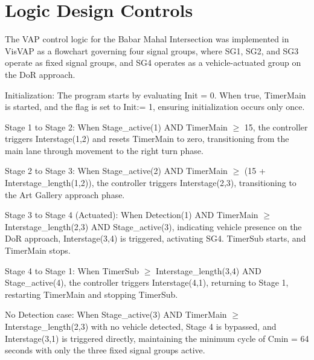 \newpage
 \section{Logic Design Controls}
The VAP control logic for the Babar Mahal Intersection was 
implemented in VisVAP as a flowchart governing four signal 
groups, where SG1, SG2, and SG3 operate as fixed signal groups, 
and SG4 operates as a vehicle-actuated group on the DoR 
approach.

Initialization: The program starts by evaluating Init = 0. 
When true, TimerMain is started, and the flag is set to Init:= 1, 
ensuring initialization occurs only once.

Stage 1 to Stage 2: When Stage\_active(1) AND TimerMain $\ge$ 15, 
the controller triggers Interstage(1,2) and resets TimerMain 
to zero, transitioning from the main lane through movement to 
the right turn phase.

Stage 2 to Stage 3: When Stage\_active(2) AND 
TimerMain $\ge$ (15 + Interstage\_length(1,2)), the controller 
triggers Interstage(2,3), transitioning to the Art Gallery 
approach phase.

Stage 3 to Stage 4 (Actuated): When Detection(1) AND 
TimerMain $\ge$ Interstage\_length(2,3) AND Stage\_active(3), 
indicating vehicle presence on the DoR approach, Interstage(3,4) 
is triggered, activating SG4. TimerSub starts, and TimerMain 
stops.

Stage 4 to Stage 1: When TimerSub $\ge$ Interstage\_length(3,4) AND 
Stage\_active(4), the controller triggers Interstage(4,1), 
returning to Stage 1, restarting TimerMain and stopping 
TimerSub.

No Detection case: When Stage\_active(3) AND TimerMain $\ge$ Interstage\_length(2,3) 
with no vehicle detected, Stage 4 is bypassed, and Interstage(3,1) 
is triggered directly, maintaining the minimum cycle of Cmin = 64 
seconds with only the three fixed signal groups active.